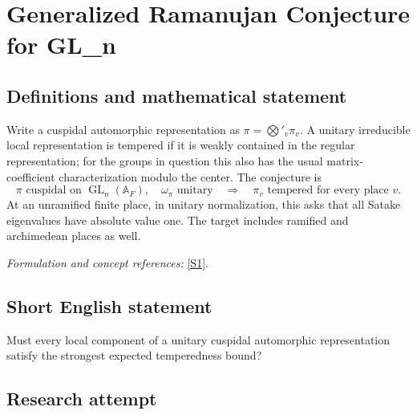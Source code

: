 \documentclass[11pt,a4paper]{article}
\newcommand{\A}{\mathbb{A}}
\newcommand{\sref}[2]{\hyperlink{source:#1:#2}{[S#2]}}
\newif\ifshowcatalogue
\newcommand{\cataloguescope}[1]{\ifshowcatalogue
 \paragraph{Exact scope in the supplied catalogue.}
 \begin{quote}\small #1\end{quote}\fi}
\numberwithin{equation}{section}
\begin{document}
\setcounter{section}{29}
\clearpage
\section{\texorpdfstring{Generalized Ramanujan Conjecture for GL\_n}{Generalized Ramanujan Conjecture for GL\_n}}\label{30}
\subsection{Definitions and mathematical statement}
Write a cuspidal automorphic representation as $\pi=\bigotimes'_v\pi_v$. A unitary irreducible local representation is tempered if it is weakly contained in the regular representation; for the groups in question this also has the usual matrix-coefficient characterization modulo the center. The conjecture is
\[
 \pi\text{ cuspidal on }\operatorname{GL}_n(\A_F),\quad
 \omega_\pi\text{ unitary}\quad\Longrightarrow\quad
 \pi_v\text{ tempered for every place }v.
\]
At an unramified finite place, in unitary normalization, this asks that all Satake eigenvalues have absolute value one. The target includes ramified and archimedean places as well.
\par\smallskip\textit{Formulation and concept references:} \sref{30}{1}.
\cataloguescope{Prove that for every number field F and every cuspidal automorphic representation pi of GL\_n(A\_F) with unitary central character, each local component pi\_v is tempered at every place v.}
\subsection{Short English statement}
Must every local component of a unitary cuspidal automorphic representation satisfy the strongest expected temperedness bound?
\subsection{Research attempt}
\end{document}
